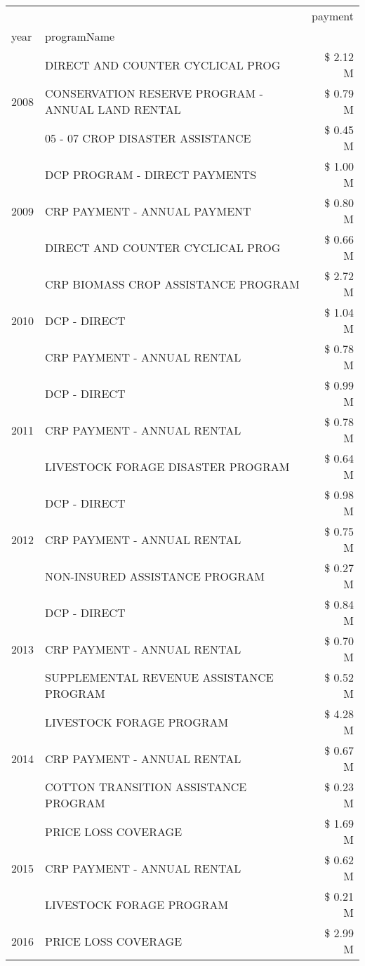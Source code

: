\begin{tabular}{llr}
\toprule
 &  & payment \\
year & programName &  \\
\midrule
\multirow[t]{3}{*}{2008} & DIRECT AND COUNTER CYCLICAL PROG & \$ 2.12 M \\
 & CONSERVATION RESERVE PROGRAM - ANNUAL LAND RENTAL & \$ 0.79 M \\
 & 05 - 07 CROP DISASTER ASSISTANCE & \$ 0.45 M \\
\cline{1-3}
\multirow[t]{3}{*}{2009} & DCP PROGRAM - DIRECT PAYMENTS & \$ 1.00 M \\
 & CRP PAYMENT - ANNUAL PAYMENT & \$ 0.80 M \\
 & DIRECT AND COUNTER CYCLICAL PROG & \$ 0.66 M \\
\cline{1-3}
\multirow[t]{3}{*}{2010} & CRP BIOMASS CROP ASSISTANCE PROGRAM & \$ 2.72 M \\
 & DCP - DIRECT & \$ 1.04 M \\
 & CRP PAYMENT - ANNUAL RENTAL & \$ 0.78 M \\
\cline{1-3}
\multirow[t]{3}{*}{2011} & DCP - DIRECT & \$ 0.99 M \\
 & CRP PAYMENT - ANNUAL RENTAL & \$ 0.78 M \\
 & LIVESTOCK FORAGE DISASTER PROGRAM & \$ 0.64 M \\
\cline{1-3}
\multirow[t]{3}{*}{2012} & DCP - DIRECT & \$ 0.98 M \\
 & CRP PAYMENT - ANNUAL RENTAL & \$ 0.75 M \\
 & NON-INSURED ASSISTANCE PROGRAM & \$ 0.27 M \\
\cline{1-3}
\multirow[t]{3}{*}{2013} & DCP - DIRECT & \$ 0.84 M \\
 & CRP PAYMENT - ANNUAL RENTAL & \$ 0.70 M \\
 & SUPPLEMENTAL REVENUE ASSISTANCE PROGRAM & \$ 0.52 M \\
\cline{1-3}
\multirow[t]{3}{*}{2014} & LIVESTOCK FORAGE PROGRAM & \$ 4.28 M \\
 & CRP PAYMENT - ANNUAL RENTAL & \$ 0.67 M \\
 & COTTON TRANSITION ASSISTANCE PROGRAM & \$ 0.23 M \\
\cline{1-3}
\multirow[t]{3}{*}{2015} & PRICE LOSS COVERAGE & \$ 1.69 M \\
 & CRP PAYMENT - ANNUAL RENTAL & \$ 0.62 M \\
 & LIVESTOCK FORAGE PROGRAM & \$ 0.21 M \\
\cline{1-3}
\multirow[t]{3}{*}{2016} & PRICE LOSS COVERAGE & \$ 2.99 M \\

\end{tabular}
